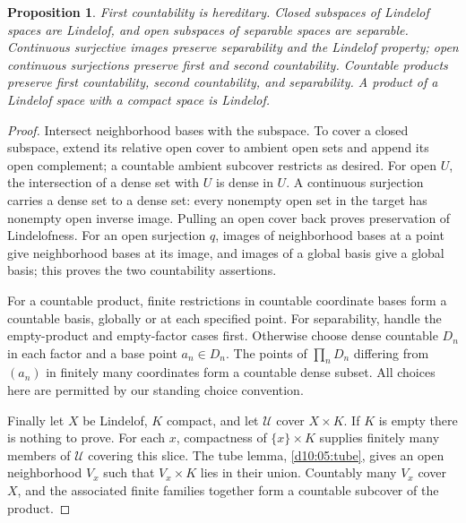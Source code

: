 \documentclass[11pt,oneside,openany]{book}
\newtheorem{proposition}[theorem]{Proposition}
\theoremstyle{definition}
\theoremstyle{remark}
\begin{document}
\begin{proposition}\label{d10:08:permanence}
First countability is hereditary. Closed subspaces of Lindelof spaces are Lindelof, and open subspaces of separable spaces are separable. Continuous surjective images preserve separability and the Lindelof property; open continuous surjections preserve first and second countability. Countable products preserve first countability, second countability, and separability. A product of a Lindelof space with a compact space is Lindelof.
\end{proposition}
\begin{proof}
Intersect neighborhood bases with the subspace. To cover a closed subspace, extend its relative open cover to ambient open sets and append its open complement; a countable ambient subcover restricts as desired. For open $U$, the intersection of a dense set with $U$ is dense in $U$. A continuous surjection carries a dense set to a dense set: every nonempty open set in the target has nonempty open inverse image. Pulling an open cover back proves preservation of Lindelofness. For an open surjection $q$, images of neighborhood bases at a point give neighborhood bases at its image, and images of a global basis give a global basis; this proves the two countability assertions.

For a countable product, finite restrictions in countable coordinate bases form a countable basis, globally or at each specified point. For separability, handle the empty-product and empty-factor cases first. Otherwise choose dense countable $D_n$ in each factor and a base point $a_n\in D_n$. The points of $\prod_nD_n$ differing from $(a_n)$ in finitely many coordinates form a countable dense subset. All choices here are permitted by our standing choice convention.

Finally let $X$ be Lindelof, $K$ compact, and let $\mathcal U$ cover $X\times K$. If $K$ is empty there is nothing to prove. For each $x$, compactness of $\{x\}\times K$ supplies finitely many members of $\mathcal U$ covering this slice. The tube lemma, \cref{d10:05:tube}, gives an open neighborhood $V_x$ such that $V_x\times K$ lies in their union. Countably many $V_x$ cover $X$, and the associated finite families together form a countable subcover of the product.
\end{proof}
\end{document}
